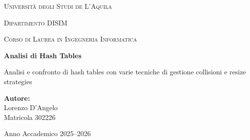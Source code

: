 \begin{titlepage}
    \centering
    
    {\scshape\LARGE Università degli Studi de L'Aquila \par}
    \vspace{1.5cm}
    
    {\scshape\Large Dipartimento DISIM \par}
    \vspace{0.5cm}
    
    {\scshape\large Corso di Laurea in Ingegneria Informatica \par}
    \vspace{2cm}
    
    {\Huge\bfseries Analisi di Hash Tables\par}
    \vspace{0.5cm}
    
    {\Large Analisi e confronto di hash tables con varie tecniche di gestione collisioni e resize strategies\par}
    \vspace{2cm}
    
    \begin{flushright}
        \large
        \textbf{Autore:} \\
        Lorenzo D'Angelo \\
        Matricola 302226
    \end{flushright}
    
    \vfill
    
    {\large Anno Accademico 2025--2026\par}
    
\end{titlepage}